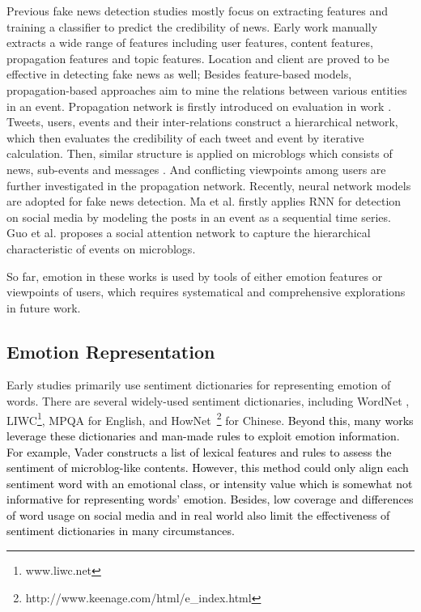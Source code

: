 \documentclass[conference]{IEEEtran}
\newcommand{\new}[1]{\textcolor{black}{{#1}}}
\begin{document}
	Previous fake news detection studies mostly focus on extracting features and training a classifier to predict the credibility of news. Early work manually extracts a wide range of features including user features, content features, propagation features and topic features\cite{castillo2011information}.  Location and client are proved to be effective in detecting fake news as well\cite{yang2012automatic}; Besides feature-based models, propagation-based approaches aim to mine the relations between various entities in an event. Propagation network is firstly introduced on evaluation in work \cite{gupta2012evaluating}. Tweets, users, events and their inter-relations construct a hierarchical network, which then evaluates the credibility of each tweet and event by iterative calculation. Then, similar structure is applied on microblogs which consists of news, sub-events and messages \cite{jin2014news}. And conflicting viewpoints among users are further investigated in the propagation network\cite{jin2016news}.  Recently, neural network models are adopted for fake news detection. Ma et al.\cite{ma2016detecting} firstly applies RNN for detection on social media by modeling the posts in an event as a sequential time series. Guo et al.\cite{guo2018rumor} proposes a social attention network to capture the hierarchical characteristic of events on microblogs. 
	
	So far,  emotion in these works is used by tools of either emotion features or viewpoints of users, which requires systematical and comprehensive explorations in future work.
	
	\subsection{Emotion Representation}
	
	Early studies primarily use sentiment dictionaries for representing emotion of words. There are several widely-used sentiment dictionaries, including WordNet \cite{wordnet}, LIWC\footnote{www.liwc.net}, MPQA \cite{MPQA}for English, and HowNet~\footnote{http://www.keenage.com/html/e\_index.html} for Chinese. \new{Beyond this, many works leverage these dictionaries and man-made rules to exploit emotion information. For example, Vader\cite{hutto2014vader} constructs a list of lexical features and rules to assess the sentiment of microblog-like contents. However, this method could only align each sentiment word with an emotional class, or intensity value which is somewhat not informative for representing words' emotion. Besides, low coverage and differences of word usage on social media and in real world also limit the effectiveness of sentiment dictionaries in many circumstances. }
	
\end{document}
